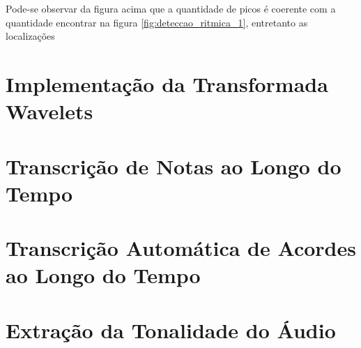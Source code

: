 Pode-se observar da figura acima que a quantidade de picos é coerente com a quantidade encontrar na figura \ref{fig:deteccao_ritmica_1}, entretanto as localizações 






\section{Implementação da Transformada Wavelets}

\section{Transcrição de Notas ao Longo do Tempo}

\section{Transcrição Automática de Acordes ao Longo do Tempo}

\section{Extração da Tonalidade do Áudio}

